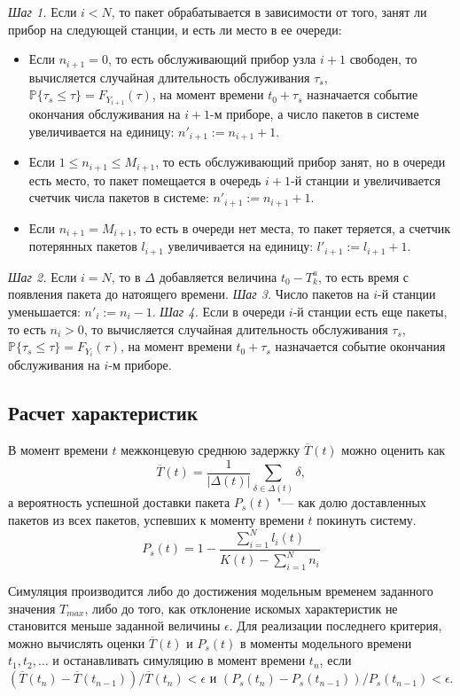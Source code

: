 \textit{Шаг 1.} Если $i < N$, то пакет обрабатывается в зависимости от того, занят ли прибор на следующей станции, и есть ли место в ее очереди:
\begin{itemize}
\item Если $n_{i+1} = 0$, то есть обслуживающий прибор узла $i+1$ свободен, то вычисляется случайная длительность обслуживания $\tau_s$, $\mathbb{P}\{\tau_s \leqslant \tau\} = F_{Y_{i+1}}(\tau)$, на момент времени $t_0 + \tau_s$ назначается событие окончания обслуживания на $i+1$-м приборе, а число пакетов в системе увеличивается на единицу: $n'_{i+1} := n_{i+1} + 1$.
\item Если $1 \leqslant n_{i+1} \leqslant M_{i+1}$, то есть обслуживающий прибор занят, но в очереди есть место, то пакет помещается в очередь $i+1$-й станции и увеличивается счетчик числа пакетов в системе: $n'_{i+1} := n_{i+1} + 1$.
\item Если $n_{i+1} = M_{i+1}$, то есть в очереди нет места, то пакет теряется, а счетчик потерянных пакетов $l_{i+1}$ увеличивается на единицу: $l'_{i+1} := l_{i+1} + 1$.
\end{itemize}

\textit{Шаг 2.} Если $i = N$, то в $\Delta$ добавляется величина $t_0 - T_k^a$, то есть время с появления пакета до натоящего времени.
\textit{Шаг 3.} Число пакетов на $i$-й станции уменьшается: $n'_i := n_i - 1$.
\textit{Шаг 4.} Если в очереди $i$-й станции есть еще пакеты, то есть $n_i > 0$, то вычисляется случайная длительность обслуживания $\tau_s$, $\mathbb{P}\{\tau_s \leqslant \tau\} = F_{Y_i}(\tau)$, на момент времени $t_0 + \tau_s$ назначается событие окончания обслуживания на $i$-м приборе.



\subsection{Расчет характеристик}

В момент времени $t$ межконцевую среднюю задержку $\overline{T}(t)$ можно оценить как
$$
\overline{T}(t) = \frac{1}{|\Delta(t)|}\sum\limits_{\delta \in \Delta(t)} \delta,
$$
а вероятность успешной доставки пакета $P_s(t)$ "--- как долю доставленных пакетов из всех пакетов, успевших к моменту времени $t$ покинуть систему.
$$
P_s(t) = 1 - \frac{\sum\limits_{i=1}^{N} l_i(t)}{K(t) - \sum\limits_{i=1}^{N} n_i}
$$

Симуляция производится либо до достижения модельным временем заданного значения $T_{max}$, либо до того, как отклонение искомых характеристик не становится меньше заданной величины $\epsilon$. Для реализации последнего критерия, можно вычислять оценки $\overline{T}(t)$ и $P_s(t)$ в моменты модельного времени $t_1, t_2, \dots$ и останавливать симуляцию в момент времени $t_n$, если $\left(\overline{T}(t_n) - \overline{T}(t_{n-1}) \right) / \overline{T}(t_n) < \epsilon$ и $\left( P_s(t_n) - P_s(t_{n-1}) \right) / P_s(t_{n-1}) < \epsilon$.


